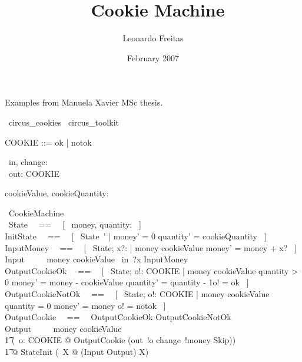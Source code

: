 \documentclass{article}
\begin{document}
\title{\Circus\ Cookie Machine}
\author{Leonardo Freitas}
\date{February 2007}

\maketitle

Examples from Manuela Xavier MSc thesis.

\begin{zsection}
  \SECTION\ circus\_cookies \parents\ circus\_toolkit
\end{zsection}

\begin{zed}
   COOKIE ::= ok | notok
\end{zed}

\begin{circus}
   \circchannel\ in, change: \nat \\
   \circchannel\ out: COOKIE
\end{circus}

\begin{axdef}
   cookieValue, cookieQuantity: \nat
\end{axdef} 

\begin{circus}
    \circprocess\ CookieMachine \circdef \circbegin \\    
    \circstate\ State ~~==~~ [~ money, quantity: \nat ~]  \\   
    InitState ~~==~~ [~ State~' | money' = 0 \land quantity' = cookieQuantity ~] \\
    InputMoney ~~==~~ [~ \Delta State; x?: \nat | money \leq cookieValue \land money' = money + x? ~] \\
    Input ~~\circdef~~ \lcircguard money \leq cookieValue \rcircguard  \circguard\ in~?x \then InputMoney \\
    OutputCookieOk ~~==~~ [~ \Delta State; o!: COOKIE | money \geq cookieValue \land 
        quantity > 0 \land money' = money - cookieValue \land quantity' = quantity - 1\land o! = ok ~] \\
    OutputCookieNotOk ~~==~~ [~ \Delta State; o!: COOKIE | money \geq cookieValue \land
        quantity = 0 \land money' = money \land o! = notok ~] \\
    OutputCookie ~~==~~ OutputCookieOk \lor OutputCookieNotOk \\
    Output ~~\circdef~~ \lcircguard money \geq cookieValue \rcircguard \circguard\ \\
        \t1 (\circvar\ o: COOKIE @ OutputCookie \circseq (out~!o \then change~!money \then Skip)) \\
    \t1 @ StateInit \circseq (\circmu\ X @ (Input \extchoice Output) \circseq X) \\
   \circend
\end{circus}
\end{document}
